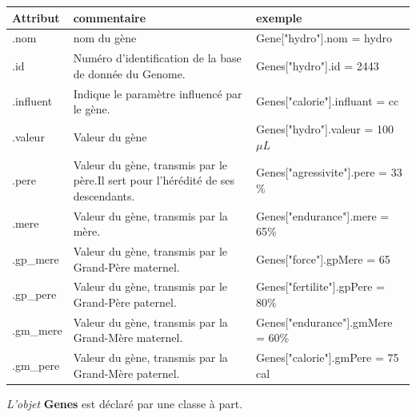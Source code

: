 \documentclass[french]{report}
\begin{document}
\begin{table}[htdp]
	
	
	
	
	\begin{tabular}{|p{1.5cm}|p{8cm}|l|}
		\hline
		\rowcolor{yellow} \textbf{Attribut}  & \textbf{commentaire} & \textbf{exemple}\\
		\hline .nom & nom du gène & Gene["hydro"].nom = hydro\\
		\hline .id & Numéro d'identification de la base de donnée du Genome. & Genes["hydro"].id = 2443\\
		\hline .influent & Indique le paramètre influencé par le gène.\footnotemark[1] &  Genes["calorie"].influant = cc \\
		\hline .valeur &  Valeur  du gène\footnotemark[2] &  Genes["hydro"].valeur = 100 $\mu L$ \\
		\hline .pere & Valeur du gène, transmis par le père.\footnotemark[3] Il sert pour l'hérédité de ses descendants. & Genes["agressivite"].pere = 33 \%\\
		\hline .mere & Valeur du gène, transmis par la mère.\footnotemark[3] & Genes["endurance"].mere = 65\%\\ 
		\hline .gp\_mere & Valeur du gène, transmis par le Grand-Père maternel.\footnotemark[3] & Genes["force"].gpMere = 65\\
		\hline .gp\_pere & Valeur du gène, transmis par le Grand-Père paternel.\footnotemark[3] & Genes["fertilite"].gpPere = 80\%\\
		\hline .gm\_mere & Valeur du gène, transmis par la Grand-Mère maternel.\footnotemark[3] & Genes["endurance"].gmMere = 60\%\\
		\hline .gm\_pere & Valeur du gène, transmis par la Grand-Mère paternel.\footnotemark[3] & Genes["calorie"].gmPere = 75 cal\\ \hline
		
	\end{tabular}
	
\end{table}

\textit{L'objet} \textbf{Genes} est déclaré par une classe à part.
\end{document}
